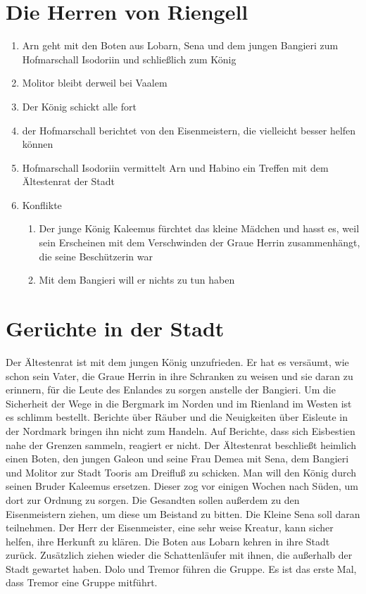 \documentclass[12pt,a4paper,onecolumn,twoside,ngerman]{book}
\newcommand{\Molitor}{Molitor}
\newcommand{\Sena}{Sena}
\newcommand{\Bangiri}{Bangieri}
\newcommand{\Enland}{Enland}
\newcommand{\Schattenlaufer}{Schattenläufer}
\newcommand{\Dolo}{Dolo}
\newcommand{\Tremor}{Tremor}
\newcommand{\Lobarn}{Lobarn}
\newcommand{\Nordmark}{Nordmark}
\newcommand{\Bergmark}{Bergmark}
\newcommand{\Arn}{Arn}
\newcommand{\Eisleute}{Eisleute}
\newcommand{\Eisbestien}{Eisbestien}
\newcommand{\Rhinland}{Rienland}
\newcommand{\Rhingell}{Riengell}
\newcommand{\Habino}{Habino}
\newcommand{\Valem}{Vaalem}
\newcommand{\Kalemus}{Kaleemus}
\newcommand{\Isodoriin}{Isodoriin}
\newcommand{\Galeon}{Galeon}
\newcommand{\Demea}{Demea}
\newcommand{\Dreifluss}{Dreifluß}
\newcommand{\Toris}{Tooris}
\newcommand{\Eisenmeister}{Eisenmeister}
\begin{document}
\section{Die Herren von \Rhingell}
\begin{enumerate}
  \item {\Arn} geht mit den Boten aus {\Lobarn}, {\Sena} und dem jungen {\Bangiri} zum Hofmarschall {\Isodoriin} und schließlich zum König
  \item {\Molitor} bleibt derweil bei {\Valem}
  \item Der König schickt alle fort
  \item der Hofmarschall berichtet von den {\Eisenmeister}n, die vielleicht besser helfen können
  \item Hofmarschall {\Isodoriin} vermittelt {\Arn} und {\Habino} ein Treffen mit dem Ältestenrat der Stadt
  \item Konflikte
  \begin{enumerate}
    \item Der junge König {\Kalemus} fürchtet das kleine Mädchen und hasst es, weil sein Erscheinen mit dem Verschwinden der Graue Herrin zusammenhängt, die seine Beschützerin war
    \item Mit dem {\Bangiri} will er nichts zu tun haben
  \end{enumerate}
\end{enumerate}

\section{Gerüchte in der Stadt}
Der Ältestenrat ist mit dem jungen König unzufrieden. Er hat es versäumt, wie schon sein Vater, die Graue Herrin in ihre Schranken zu weisen und sie daran zu erinnern, für die Leute des {\Enland}es zu sorgen anstelle der {\Bangiri}. Um die Sicherheit der Wege in die {\Bergmark} im Norden und im {\Rhinland} im Westen ist es schlimm bestellt. Berichte über Räuber und die Neuigkeiten über {\Eisleute} in der {\Nordmark} bringen ihn nicht zum Handeln. Auf Berichte, dass sich {\Eisbestien} nahe der Grenzen sammeln, reagiert er nicht.\linebreak
Der Ältestenrat beschließt heimlich einen Boten, den jungen {\Galeon} und seine Frau {\Demea} mit {\Sena}, dem {\Bangiri} und {\Molitor} zur Stadt {\Toris} am {\Dreifluss} zu schicken. Man will den König durch seinen Bruder {\Kalemus} ersetzen. Dieser zog vor einigen Wochen nach Süden, um dort zur Ordnung zu sorgen. Die Gesandten sollen außerdem zu den {\Eisenmeister}{n} ziehen, um diese um Beistand zu bitten. Die Kleine {\Sena} soll daran teilnehmen. Der Herr der {\Eisenmeister}, eine sehr weise Kreatur, kann sicher helfen, ihre Herkunft zu klären.\linebreak
Die Boten aus {\Lobarn} kehren in ihre Stadt zurück. Zusätzlich ziehen wieder die {\Schattenlaufer} mit ihnen, die außerhalb der Stadt gewartet haben. {\Dolo} und {\Tremor} führen die Gruppe. Es ist das erste Mal, dass {\Tremor} eine Gruppe mitführt.
\end{document}
